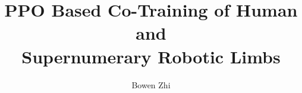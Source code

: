 \documentclass[a4paper, twoside, 12 pt]{report}
\title{PPO Based Co-Training of Human and \\[0.4cm] Supernumerary Robotic Limbs}
\author{Bowen Zhi}
\begin{document}








\renewcommand{\bibname}{Reference}

\end{document}

